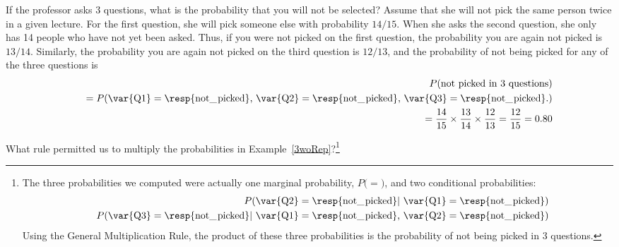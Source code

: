 \begin{example}{If the professor asks 3 questions, what is the probability that you will not be selected? Assume that she will not pick the same person twice in a given lecture.}\label{3woRep}
For the first question, she will pick someone else with probability $14/15$. When she asks the second question, she only has 14 people who have not yet been asked. Thus, if you were not picked on the first question, the probability you are again not picked is $13/14$. Similarly, the probability you are again not picked on the third question is $12/13$, and the probability of not being picked for any of the three questions is
\begin{eqnarray*}
&&P(\text{not picked in 3 questions}) \\
&&\quad = P(\text{\var{Q1}} = \text{\resp{not\_\hspace{0.3mm}picked}, }\text{\var{Q2}} = \text{\resp{not\_\hspace{0.3mm}picked}, }\text{\var{Q3}} = \text{\resp{not\_\hspace{0.3mm}picked}.}) \\
&&\quad = \frac{14}{15}\times\frac{13}{14}\times\frac{12}{13} = \frac{12}{15} = 0.80
\end{eqnarray*}
\end{example}

\begin{exercise}
What rule permitted us to multiply the probabilities in Example~\ref{3woRep}?\footnote{The three probabilities we computed were actually one marginal probability, $P($$ = $$)$, and two conditional probabilities:
\begin{eqnarray*}
&&P(\text{\var{Q2}} =  \text{\resp{not\_\hspace{0.3mm}picked}}|\text{ \var{Q1}} = \text{\resp{not\_\hspace{0.3mm}picked}}) \\
&&P(\text{\var{Q3}} =  \text{\resp{not\_\hspace{0.3mm}picked}}|\text{ \var{Q1}} = \text{\resp{not\_\hspace{0.3mm}picked}, }\text{\var{Q2}} = \text{\resp{not\_\hspace{0.3mm}picked}})
\end{eqnarray*}
Using the General Multiplication Rule, the product of these three probabilities is the probability of not being picked in 3 questions.}
\end{exercise}

